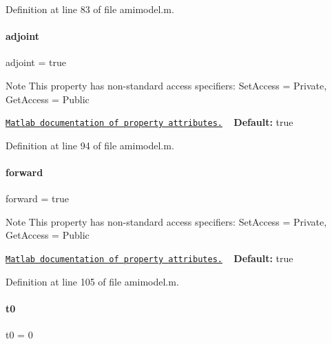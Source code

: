 Definition at line 83 of file amimodel.\+m.

\mbox{\label{classamimodel_ab6d500b41cf50693452415caca31d32e}} 
\paragraph{\texorpdfstring{adjoint}{adjoint}}
{\footnotesize\ttfamily adjoint = true}

\begin{DoxyNote}{Note}
This property has non-\/standard access specifiers\+: {\ttfamily Set\+Access = Private, Get\+Access = Public} 

\href{http://www.mathworks.com/help/matlab/matlab_oop/property-attributes.html}{\tt Matlab documentation of property attributes.} ~\newline
{\bfseries Default\+:} true 
\end{DoxyNote}


Definition at line 94 of file amimodel.\+m.

\mbox{\label{classamimodel_a81e42e48c9c72814166c8f7cd414ce24}} 
\paragraph{\texorpdfstring{forward}{forward}}
{\footnotesize\ttfamily forward = true}

\begin{DoxyNote}{Note}
This property has non-\/standard access specifiers\+: {\ttfamily Set\+Access = Private, Get\+Access = Public} 

\href{http://www.mathworks.com/help/matlab/matlab_oop/property-attributes.html}{\tt Matlab documentation of property attributes.} ~\newline
{\bfseries Default\+:} true 
\end{DoxyNote}


Definition at line 105 of file amimodel.\+m.

\mbox{\label{classamimodel_abdb5a42ffee3ca622484b53a322f1004}} 
\paragraph{\texorpdfstring{t0}{t0}}
{\footnotesize\ttfamily t0 = 0}

